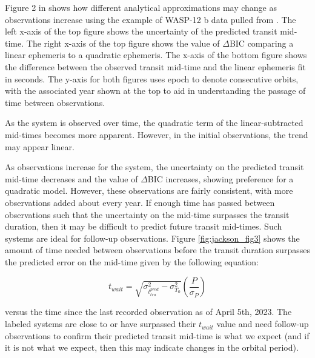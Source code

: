 \documentclass[oneside,12pt]{amsart}
\numberwithin{page}{section}
\begin{document}
Figure 2 in \citet{jackson2023metrics} shows how different analytical approximations may change as observations increase using the example of WASP-12 b data pulled from \citet{yee2019orbit}. The left x-axis of the top figure shows the uncertainty of the predicted transit mid-time. The right x-axis of the top figure shows the value of $\Delta$BIC comparing a linear ephemeris to a quadratic ephemeris. The x-axis of the bottom figure shows the difference between the observed transit mid-time and the linear ephemeris fit in seconds. The y-axis for both figures uses epoch to denote consecutive orbits, with the associated year shown at the top to aid in understanding the passage of time between observations. 

As the system is observed over time, the quadratic term of the linear-subtracted mid-times becomes more apparent. However, in the initial observations, the trend may appear linear. 

As observations increase for the system, the uncertainty on the predicted transit mid-time decreases and the value of $\Delta$BIC increases, showing preference for a quadratic model. However, these observations are fairly consistent, with more observations added about every year. If enough time has passed between observations such that the uncertainty on the mid-time surpasses the transit duration, then it may be difficult to predict future transit mid-times. Such systems are ideal for follow-up observations. Figure \ref{fig:jackson_fig3} shows the amount of time needed between observations before the transit duration surpasses the predicted error on the mid-time given by the following equation:

\begin{equation}
    t_{wait} = \sqrt{\sigma^{2}_{t^{pred}_{tra}} - \sigma^{2}_{T_{0}}} \left(\frac{P}{\sigma_{P}} \right)
    \label{t_wait}
\end{equation}

versus the time since the last recorded observation as of April 5th, 2023. The labeled systems are close to or have surpassed their $t_{wait}$ value and need follow-up observations to confirm their predicted transit mid-time is what we expect (and if it is not what we expect, then this may indicate changes in the orbital period). 
\end{document}
